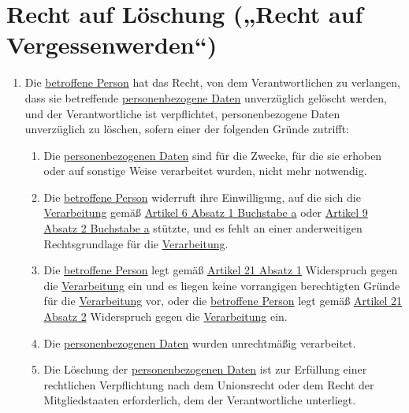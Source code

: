 \chapter{Recht auf Löschung („Recht auf Vergessenwerden“)}
\label{ch:17}


\begin{enumerate}

  \item Die \hyperref[itm:04-1]{betroffene Person} hat das Recht, von dem Verantwortlichen zu verlangen, dass sie betreffende
   \hyperref[itm:04-1]{personenbezogene Daten} unverzüglich gelöscht werden, und der Verantwortliche ist verpflichtet, personenbezogene
   Daten unverzüglich zu löschen, sofern einer der folgenden Gründe zutrifft:
  \label{itm:17-1}

  \begin{enumerate}
  
    \item Die \hyperref[itm:04-1]{personenbezogenen Daten} sind für die Zwecke, für die sie erhoben oder auf sonstige Weise verarbeitet
     wurden, nicht mehr notwendig.
    \label{itm:17-1a}

    \item Die \hyperref[itm:04-1]{betroffene Person} widerruft ihre Einwilligung, auf die sich die \hyperref[itm:04-2]{Verarbeitung} gemäß \hyperref[itm:06-1a]
     {Artikel 6 Absatz 1 Buchstabe a} oder \hyperref[itm:09-2a]{Artikel 9 Absatz 2 Buchstabe a} stützte, und es fehlt
     an einer anderweitigen Rechtsgrundlage für die \hyperref[itm:04-2]{Verarbeitung}.
    \label{itm:17-1b}

    \item Die \hyperref[itm:04-1]{betroffene Person} legt gemäß \hyperref[itm:21-1]{Artikel 21 Absatz 1} Widerspruch gegen die \hyperref[itm:04-2]{Verarbeitung}
     ein und es liegen keine vorrangigen berechtigten Gründe für die \hyperref[itm:04-2]{Verarbeitung} vor, oder die \hyperref[itm:04-1]{betroffene Person} legt
     gemäß \hyperref[itm:21-2]{Artikel 21 Absatz 2} Widerspruch gegen die \hyperref[itm:04-2]{Verarbeitung} ein.
    \label{itm:17-1c}

    \item Die \hyperref[itm:04-1]{personenbezogenen Daten} wurden unrechtmäßig verarbeitet.
    \label{itm:17-1d}

    \item Die Löschung der \hyperref[itm:04-1]{personenbezogenen Daten} ist zur Erfüllung einer rechtlichen Verpflichtung nach dem
     Unionsrecht oder dem Recht der Mitgliedstaaten erforderlich, dem der Verantwortliche unterliegt.
    \label{itm:17-1e}


\end{enumerate}
\end{enumerate}
